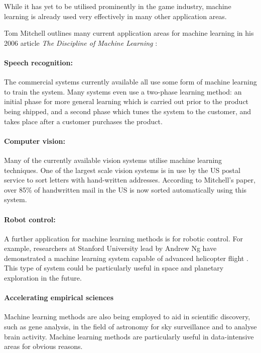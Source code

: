 \documentclass[a4paper,oneside]{report}
\begin{document}
While it has yet to be utilised prominently in the game industry, machine learning is already used very effectively in many other application areas.

Tom Mitchell outlines many current application areas for machine learning in his 2006 article \emph{The Discipline of Machine Learning} \cite{Mitchell:2006fv}:

\paragraph{Speech recognition:} The commercial systems currently available all use some form of machine learning to train the system. Many systems even use a two-phase learning method: an initial phase for more general learning which is carried out prior to the product being shipped, and a second phase which tunes the system to the customer, and takes place after a customer purchases the product.

\paragraph{Computer vision:} Many of the currently available vision systems utilise machine learning techniques. One of the largest scale vision systems is in use by the US postal service to sort letters with hand-written addresses. According to Mitchell's paper, over 85\% of handwritten mail in the US is now sorted automatically using this system.

\paragraph{Robot control:} A further application for machine learning methods is for robotic control. For example, researchers at Stanford University lead by Andrew Ng have demonstrated a machine learning system capable of advanced helicopter flight \cite{Ng:2004dz, Abbeel07anapplication, Abbeel:fu}. This type of system could be particularly useful in space and planetary exploration in the future.

\paragraph{Accelerating empirical sciences} Machine learning methods are also being employed to aid in scientific discovery, such as gene analysis, in the field of astronomy for sky surveillance and to analyse brain activity. Machine learning methods are particularly useful in data-intensive areas for obvious reasons.
\end{document}
